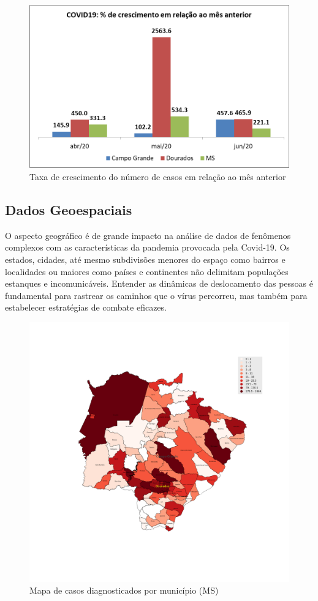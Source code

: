 \documentclass[12pt]{article}
\begin{document}
\begin{figure}[!htb]
  \centering
  \includegraphics[width=.5
  \textwidth]{figs/douCGMS02.png}
  \caption{Taxa de crescimento do número de casos em relação ao mês anterior}
  \label{fig:douCGMStaxa}
  \end{figure}

\subsection{Dados Geoespaciais}\label{ssec:geo}

O aspecto geográfico é de grande impacto na análise de dados de fenômenos complexos com as características da pandemia provocada pela Covid-19. Os estados, cidades, até mesmo subdivisões menores do espaço como bairros e localidades ou maiores como países e continentes não delimitam populações estanques e incomunicáveis. Entender as dinâmicas de deslocamento das pessoas é fundamental para rastrear os caminhos que o vírus percorreu, mas também para estabelecer estratégias de combate eficazes.

\begin{figure}[!htb]
  \centering
  \includegraphics[width=1\textwidth]{figs/mapa_casos_registrados.png}
  \caption{Mapa de casos diagnosticados por município (MS)}
  \label{fig:mapaCasos}
  \end{figure}
\end{document}
